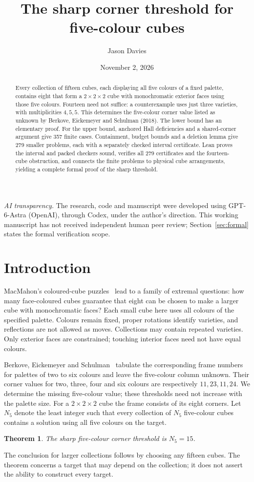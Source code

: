 \documentclass[11pt]{article}
\title{The sharp corner threshold for five-colour cubes}
\author{Jason Davies}
\date{November 2, 2026}
\newtheorem{theorem}{Theorem}
\theoremstyle{remark}
\begin{document}
\maketitle
\begin{abstract}
Every collection of fifteen cubes, each displaying all five colours of a
fixed palette, contains eight that form a $2\times2\times2$ cube with
monochromatic exterior faces using those five colours. Fourteen need not
suffice: a counterexample uses just three varieties, with multiplicities
$4,5,5$. This determines the five-colour corner value listed as unknown by
Berkove, Eickemeyer and Schulman (2018). The lower bound has an elementary
proof. For the upper bound, anchored Hall deficiencies and a shared-corner
argument give 357 finite cases. Containment, budget bounds and a deletion
lemma give 279 smaller problems, each with a separately checked interval
certificate. Lean proves the interval and packed checkers sound, verifies all
279 certificates and the fourteen-cube obstruction, and connects the finite
problems to physical cube arrangements, yielding a complete formal proof of
the sharp threshold.
\end{abstract}
\noindent\small\textit{AI transparency.} The research, code and manuscript were
developed using GPT-6-Astra (OpenAI), through Codex, under the author's
direction. This working manuscript has not received independent human peer
review; Section~\ref{sec:formal} states the formal verification scope.
\normalsize

\section{Introduction}
MacMahon's coloured-cube puzzles~\cite{MacMahon} lead to a family of extremal
questions: how many face-coloured cubes guarantee that eight can be chosen
to make a larger cube with monochromatic faces? Each small cube here uses
all colours of the specified palette. Colours remain fixed, proper rotations
identify varieties, and reflections are not allowed as moves. Collections
may contain repeated varieties. Only exterior faces are constrained;
touching interior faces need not have equal colours.

Berkove, Eickemeyer and Schulman~\cite[Section 8, Table 7]{BES} tabulate the
corresponding frame numbers for palettes of two to six colours and leave
the five-colour column unknown. Their corner values for two, three, four
and six colours are respectively $11,23,11,24$. We determine the missing
five-colour value; these thresholds need not increase with the palette size.
For a $2\times2\times2$ cube the frame consists of its eight corners.
Let $N_5$ denote the least integer such that every collection of $N_5$
five-colour cubes contains a solution using all five colours on the target.
\begin{theorem}\label{thm:main}
The sharp five-colour corner threshold is $N_5=15$.
\end{theorem}
The conclusion for larger collections follows by choosing any fifteen cubes.
The theorem concerns a target that may depend on the collection; it does
not assert the ability to construct every target.
\end{document}
